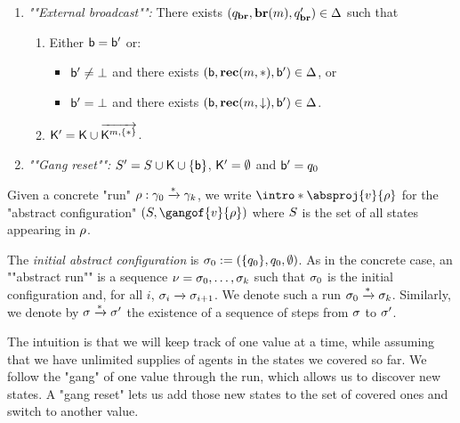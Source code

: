 \begin{definition}
\begin{enumerate}
		
		\item \emph{""External broadcast"":} There exists $(q_{\textbf{br}}, \textbf{br}(m), q_{\textbf{br}}') \in \Delta$ such that
		\begin{enumerate}[label = (\arabic*)]
			
			\item\label{item:external_broadcast_boss}Either $\mathsf{b} = \mathsf{b}'$ or:
			\begin{itemize} 
				\item $\mathsf{b}' \ne \bot$ and there exists $(\mathsf{b}, \textbf{rec}(m, {*}), \mathsf{b}') \in \Delta$, or
				\item $\mathsf{b}' = \bot$ and there exists $(\mathsf{b}, \textbf{rec}(m, \downarrow), \mathsf{b}') \in \Delta$.
			\end{itemize}
			
			\item\label{item:external_broadcast_clique} $\mathsf{K}'= \mathsf{K} \cup \overrightarrow{\mathsf{K}^{m,\{{*}\}}}$.
			
		\end{enumerate}
		\item \emph{""Gang reset"":} $S' = S \cup \mathsf{K} \cup \{\mathsf{b}\}$, $\mathsf{K}' = \emptyset$ and $\mathsf{b}'= q_0$
	\end{enumerate}
	
	
	Given a concrete "run" $\rho: \gamma_0 \xrightarrow{*} \gamma_k$, we write \AP  $\intro*\absproj{\aval}{\run}$ for the "abstract configuration" $(\covset, \gangof{\aval}{\run})$ where $S$ is the set of all states appearing in $\rho$. 
	
	The \emph{initial abstract configuration} is $\sigma_0 := (\{q_0\}, q_0, \emptyset)$. 
	As in the concrete case, an ""abstract run"" is a sequence $\nu = \sigma_0, \dots, \sigma_k$ such that $\sigma_0$ is the initial configuration and, for all $i$, $\sigma_i \xrightarrow{} \sigma_{i+1}$. We denote such a run $\sigma_0 \xrightarrow{*} \sigma_k$. Similarly, we denote by $\sigma \xrightarrow{*} \sigma'$ the existence of a sequence of steps from $\sigma$ to $\sigma'$.
\end{definition}

The intuition is that we will keep track of one value at a time, while assuming that we have unlimited supplies of agents in the states we covered so far. We follow the "gang" of one value through the run, which allows us to discover new states. A "gang reset" lets us add those new states to the set of covered ones and switch to another value.


